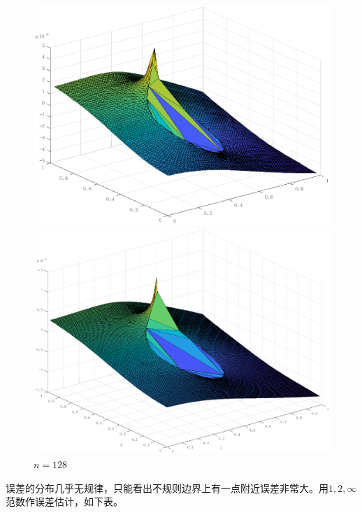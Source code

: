 \documentclass[lang=cn,11pt,a4paper]{elegantpaper}
\begin{document}
\begin{figure}[htbp]
\begin{minipage}[t]{0.24\linewidth}
    \centering
    \includegraphics[width=0.95\linewidth]{figure/error_problem1_N_ir_n=64.eps}
    \caption*{$n=64$}
  \end{minipage}
  \begin{minipage}[t]{0.24\linewidth}
    \centering
    \includegraphics[width=0.95\linewidth]{figure/error_problem1_N_ir_n=128.eps}
    \caption*{$n=128$}
  \end{minipage}
\end{figure}

误差的分布几乎无规律，只能看出不规则边界上有一点附近误差非常大。用$1,2,\infty$范数作误差估计，如下表。
\end{document}
